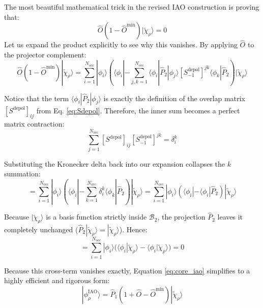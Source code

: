 \documentclass[11pt]{article}
\begin{document}
The most beautiful mathematical trick in the revised IAO construction is proving that:
\begin{equation}
    \hat{O}(1 - \hat{O}^{\text{min}}) |\tilde{\chi}_\rho\rangle = 0
\end{equation}
Let us expand the product explicitly to see why this vanishes. By applying $\hat{O}$ to the projector complement:
\begin{equation}
    \hat{O}(1 - \hat{O}^{\text{min}}) |\tilde{\chi}_\rho\rangle = \sum_{i=1}^{N_{\text{occ}}} |\phi_i\rangle \left( \langle\phi_i| - \sum_{j,k=1}^{N_{\text{occ}}} \langle\phi_i| \hat{P}_2 |\phi_j\rangle [S^{\text{depol}}_{-1}]^{jk} \langle\phi_k| \hat{P}_2 \right) |\tilde{\chi}_\rho\rangle
\end{equation}

Notice that the term $\langle\phi_i| \hat{P}_2 |\phi_j\rangle$ is exactly the definition of the overlap matrix $[S^{\text{depol}}]_{ij}$ from Eq. \ref{eq:Sdepol}. Therefore, the inner sum becomes a perfect matrix contraction:
\begin{equation}
    \sum_{j=1}^{N_{\text{occ}}} [S^{\text{depol}}]_{ij} [S^{\text{depol}}_{-1}]^{jk} = \delta_i^k
\end{equation}

Substituting the Kronecker delta back into our expansion collapses the $k$ summation:
\begin{equation}
    = \sum_{i=1}^{N_{\text{occ}}} |\phi_i\rangle \left( \langle\phi_i| - \sum_{k=1}^{N_{\text{occ}}} \delta_i^k \langle\phi_k| \hat{P}_2 \right) |\tilde{\chi}_\rho\rangle = \sum_{i=1}^{N_{\text{occ}}} |\phi_i\rangle \left( \langle\phi_i| - \langle\phi_i| \hat{P}_2 \right) |\tilde{\chi}_\rho\rangle
\end{equation}

Because $|\tilde{\chi}_\rho\rangle$ is a basis function strictly inside $\mathcal{B}_2$, the projection $\hat{P}_2$ leaves it completely unchanged ($\hat{P}_2|\tilde{\chi}_\rho\rangle = |\tilde{\chi}_\rho\rangle$). Hence:
\begin{equation}
    = \sum_{i=1}^{N_{\text{occ}}} |\phi_i\rangle \big( \langle\phi_i|\tilde{\chi}_\rho\rangle - \langle\phi_i|\tilde{\chi}_\rho\rangle \big) = 0
\end{equation}

Because this cross-term vanishes exactly, Equation \ref{eq:core_iao} simplifies to a highly efficient and rigorous form:
\begin{equation}
    |\phi_\rho^{\text{IAO}}\rangle = \hat{P}_1 (1 + \hat{O} - \hat{O}^{\text{min}}) |\tilde{\chi}_\rho\rangle \label{eq:simplified_iao}
\end{equation}
\end{document}
